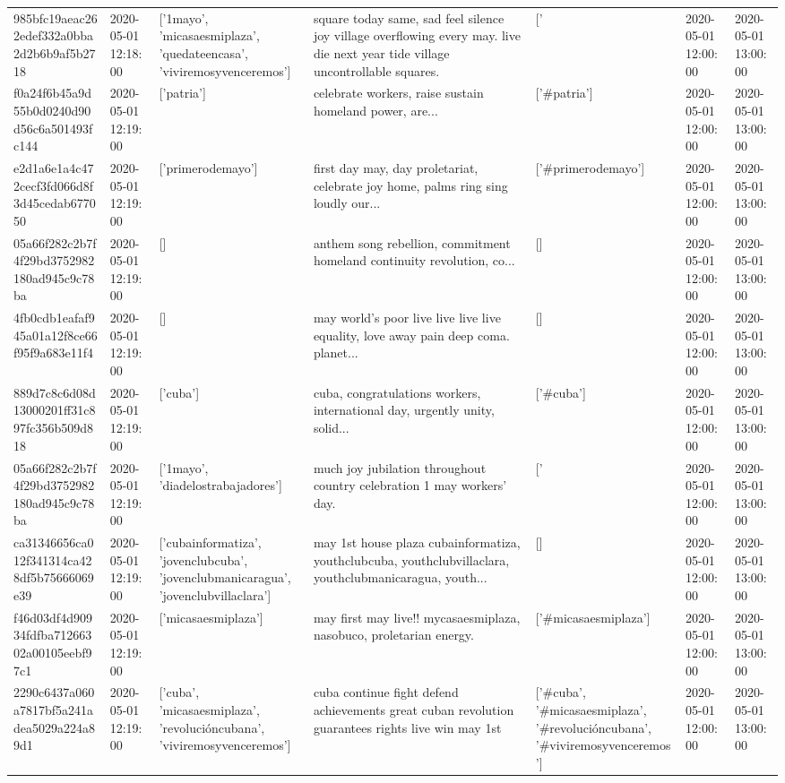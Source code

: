 \begin{tabular}{lllllll}
985bfc19aeac262edef332a0bba2d2b6b9af5b2718 & 2020-05-01 12:18:00 & ['1mayo', 'micasaesmiplaza', 'quedateencasa', 'viviremosyvenceremos'] & square today same, sad feel silence joy village overflowing every may. live die next year tide village uncontrollable squares. & ['#1mayo', '#micasaesmiplaza', '#quedateencasa', '#viviremosyvenceremos'] & 2020-05-01 12:00:00 & 2020-05-01 13:00:00 \\
f0a24f6b45a9d55b0d0240d90d56c6a501493fc144 & 2020-05-01 12:19:00 & ['patria'] & celebrate workers, raise sustain homeland power, are... & ['#patria'] & 2020-05-01 12:00:00 & 2020-05-01 13:00:00 \\
e2d1a6e1a4c472cecf3fd066d8f3d45cedab677050 & 2020-05-01 12:19:00 & ['primerodemayo'] & first day may, day proletariat, celebrate joy home, palms ring sing loudly our... & ['#primerodemayo'] & 2020-05-01 12:00:00 & 2020-05-01 13:00:00 \\
05a66f282c2b7f4f29bd3752982180ad945c9c78ba & 2020-05-01 12:19:00 & [] & anthem song rebellion, commitment homeland continuity revolution, co... & [] & 2020-05-01 12:00:00 & 2020-05-01 13:00:00 \\
4fb0cdb1eafaf945a01a12f8ce66f95f9a683e11f4 & 2020-05-01 12:19:00 & [] & may world's poor live live live live equality, love away pain deep coma. planet... & [] & 2020-05-01 12:00:00 & 2020-05-01 13:00:00 \\
889d7c8c6d08d13000201ff31c897fc356b509d818 & 2020-05-01 12:19:00 & ['cuba'] & cuba, congratulations workers, international day, urgently unity, solid... & ['#cuba'] & 2020-05-01 12:00:00 & 2020-05-01 13:00:00 \\
05a66f282c2b7f4f29bd3752982180ad945c9c78ba & 2020-05-01 12:19:00 & ['1mayo', 'diadelostrabajadores'] & much joy jubilation throughout country celebration 1 may workers' day. & ['#1mayo', '#diadelostrabajadores'] & 2020-05-01 12:00:00 & 2020-05-01 13:00:00 \\
ca31346656ca012f341314ca428df5b75666069e39 & 2020-05-01 12:19:00 & ['cubainformatiza', 'jovenclubcuba', 'jovenclubmanicaragua', 'jovenclubvillaclara'] & may 1st house plaza cubainformatiza, youthclubcuba, youthclubvillaclara, youthclubmanicaragua, youth... & [] & 2020-05-01 12:00:00 & 2020-05-01 13:00:00 \\
f46d03df4d90934fdfba71266302a00105eebf97c1 & 2020-05-01 12:19:00 & ['micasaesmiplaza'] & may first may live!! mycasaesmiplaza, nasobuco, proletarian energy. & ['#micasaesmiplaza'] & 2020-05-01 12:00:00 & 2020-05-01 13:00:00 \\
2290c6437a060a7817bf5a241adea5029a224a89d1 & 2020-05-01 12:19:00 & ['cuba', 'micasaesmiplaza', 'revolucióncubana', 'viviremosyvenceremos'] & cuba continue fight defend achievements great cuban revolution guarantees rights live win may 1st & ['#cuba', '#micasaesmiplaza', '#revolucióncubana', '#viviremosyvenceremos'] & 2020-05-01 12:00:00 & 2020-05-01 13:00:00 \\

\end{tabular}
